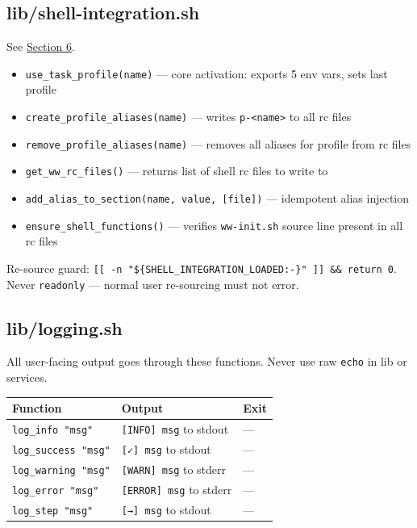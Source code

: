 \documentclass[
]{article}
\newcounter{none} %
\providecommand{\tightlist}{%
  \setlength{\itemsep}{0pt}\setlength{\parskip}{0pt}}
\begin{document}
\subsection{lib/shell-integration.sh}\label{libshell-integration.sh}

See \hyperref[6-shell-bootstrap]{Section 6}.

\begin{itemize}
\tightlist
\item
  \texttt{use\_task\_profile(name)} --- core activation: exports 5 env
  vars, sets last profile
\item
  \texttt{create\_profile\_aliases(name)} --- writes
  \texttt{p-\textless{}name\textgreater{}} to all rc files
\item
  \texttt{remove\_profile\_aliases(name)} --- removes all aliases for
  profile from rc files
\item
  \texttt{get\_ww\_rc\_files()} --- returns list of shell rc files to
  write to
\item
  \texttt{add\_alias\_to\_section(name,\ value,\ {[}file{]})} ---
  idempotent alias injection
\item
  \texttt{ensure\_shell\_functions()} --- verifies \texttt{ww-init.sh}
  source line present in all rc files
\end{itemize}

Re-source guard:
\texttt{{[}{[}\ -n\ "\$\{SHELL\_INTEGRATION\_LOADED:-\}"\ {]}{]}\ \&\&\ return\ 0}.
Never \texttt{readonly} --- normal user re-sourcing must not error.

\subsection{lib/logging.sh}\label{liblogging.sh}

All user-facing output goes through these functions. Never use raw
\texttt{echo} in lib or services.

{\def\LTcaptype{none} %
\begin{longtable}[]{@{}lll@{}}
\toprule\noalign{}
Function & Output & Exit \\
\midrule\noalign{}
\endhead
\bottomrule\noalign{}
\endlastfoot
\texttt{log\_info\ "msg"} & \texttt{{[}INFO{]}\ msg} to stdout & --- \\
\texttt{log\_success\ "msg"} & \texttt{{[}✓{]}\ msg} to stdout & --- \\
\texttt{log\_warning\ "msg"} & \texttt{{[}WARN{]}\ msg} to stderr &
--- \\
\texttt{log\_error\ "msg"} & \texttt{{[}ERROR{]}\ msg} to stderr &
--- \\
\texttt{log\_step\ "msg"} & \texttt{{[}→{]}\ msg} to stdout & --- \\
\end{longtable}
}
\end{document}
